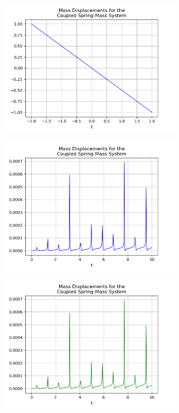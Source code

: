 \documentclass{article}
\begin{document}
\begin{figure}[h!]
\begin{subfigure}[b]{0.32\linewidth}
    \includegraphics[width=\linewidth]{two_springs223.png}
    \caption{}
  \end{subfigure}
  \begin{subfigure}[b]{0.45\linewidth}
    \includegraphics[width=\linewidth]{two_springs22e1.png}
    \caption{}
  \end{subfigure}
  \begin{subfigure}[b]{0.45\linewidth}
    \includegraphics[width=\linewidth]{two_springs22e2.png}

\end{subfigure}
\end{figure}
\end{document}

